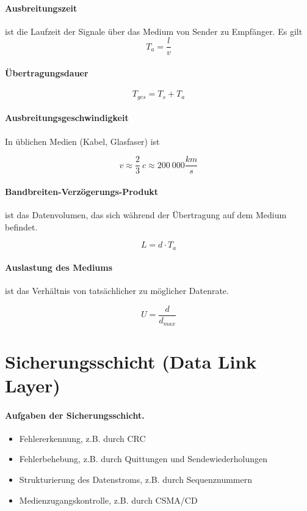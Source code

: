 \documentclass[]{scrartcl}
\begin{document}
\paragraph{Ausbreitungszeit} ist die Laufzeit der Signale 
\"uber das Medium von Sender zu Empf\"anger. Es 
gilt 
$$ T_{a} = \frac{l}{v}$$

\paragraph{\"Ubertragungsdauer}
$$T_{ges} = T_{s} + T_{a}$$

\paragraph{Ausbreitungsgeschwindigkeit} In \"ublichen Medien (Kabel, Glasfaser) ist

$$ v \approx \frac{2}{3} \ c \approx 200 \ 000 \frac{km}{s}$$

\paragraph{Bandbreiten-Verz\"ogerungs-Produkt} ist das Datenvolumen, das sich w\"ahrend der \"Ubertragung auf dem Medium befindet.

$$L = d \cdot T_{a}$$

\paragraph{Auslastung des Mediums } ist das Verh\"altnis von tats\"achlicher zu m\"oglicher Datenrate.

$$U = \frac{d}{d_{max}}$$


\section{Sicherungsschicht (Data Link Layer)}

\paragraph{Aufgaben der Sicherungsschicht.}
\begin{itemize}
\item Fehlererkennung, z.B. durch CRC
\item Fehlerbehebung, z.B. durch Quittungen und Sendewiederholungen
\item Strukturierung des Datenstroms, z.B. durch Sequenznummern
\item Medienzugangskontrolle, z.B. durch CSMA/CD
\end{itemize}
\end{document}
